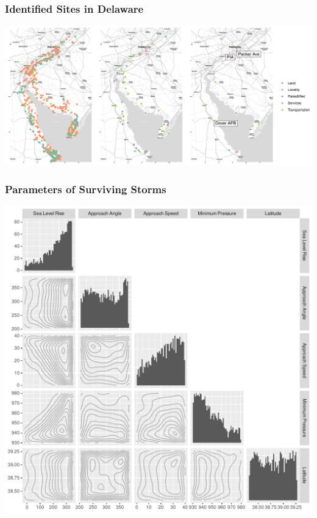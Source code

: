 \documentclass[aspectratio=169,10pt]{beamer}
\newlength{\frametextheight}
\begin{document}
\begin{frame}
    \frametitle{Identified Sites in Delaware}
    \begin{centering}
        \includegraphics[width=0.99\linewidth]{./ch3/plots/delaware}
    \end{centering}
\end{frame} %

\begin{frame}
    \frametitle{Parameters of Surviving Storms}
    \begin{center}
        \includegraphics[height=0.99\frametextheight]{./ch3/plots/threshold_pairs}
    \end{center}
\end{frame} %
\end{document}
